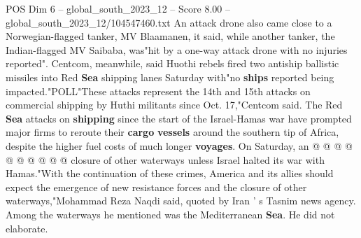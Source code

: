 \begin{textsample}{POS Dim 6 – global\_south\_2023\_12 – Score 8.00 – global\_south\_2023\_12/104547460.txt}
An attack drone also came close to a Norwegian-flagged tanker, MV Blaamanen, it said, while another tanker, the Indian-flagged MV Saibaba, was"hit by a one-way attack drone with no injuries reported".
Centcom, meanwhile, said Huothi rebels fired two antiship ballistic missiles into Red \textbf{Sea} shipping lanes Saturday with"no \textbf{ships} reported being impacted."POLL"These attacks represent the 14th and 15th attacks on commercial shipping by Huthi militants since Oct. 17,"Centcom said.
The Red \textbf{Sea} attacks on \textbf{shipping} since the start of the Israel-Hamas war have prompted major firms to reroute their \textbf{cargo} \textbf{vessels} around the southern tip of Africa, despite the higher fuel costs of much longer \textbf{voyages}.
On Saturday, an @ @ @ @ @ @ @ @ @ @ closure of other waterways unless Israel halted its war with Hamas."With the continuation of these crimes, America and its allies should expect the emergence of new resistance forces and the closure of other waterways,"Mohammad Reza Naqdi said, quoted by Iran ' s Tasnim news agency.
Among the waterways he mentioned was the Mediterranean \textbf{Sea}.
He did not elaborate.

\end{textsample}
